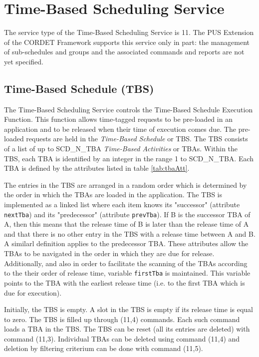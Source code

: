 \documentclass{pnp_article}
\begin{document}
\section{Time-Based Scheduling Service}\label{sec:serv11}
The service type of the Time-Based Scheduling Service is 11. The PUS Extension of the CORDET Framework supports this service only in part: the management of sub-schedules and groups and the associated commands and reports are not yet specified. 

\subsection{Time-Based Schedule (TBS)}
The Time-Based Scheduling Service controls the Time-Based Schedule Execution Function. This function allows time-tagged requests to be pre-loaded in an application and to be released when their time of execution comes due. The pre-loaded requests are held in the \textit{Time-Based Schedule} or TBS. The TBS consists of a list of up to SCD\_N\_TBA \textit{Time-Based Activities} or TBAs. Within the TBS, each TBA is identified by an integer in the range 1 to SCD\_N\_TBA. Each TBA is defined by the attributes listed in table \ref{tab:tbaAtt}. 

The entries in the TBS are arranged in a random order which is determined by the order in which the TBAs are loaded in the application. The TBS is implemented as a linked list where each item knows its "successor" (attribute \texttt{nextTba}) and its "predecessor" (attribute \texttt{prevTba}). If B is the successor TBA of A, then this means that the release time of B is later than the release time of A and that there is no other entry in the TBS with a release time between A and B. A similarl definition applies to the predecessor TBA. These attributes allow the TBAs to be navigated in the order in which they are due for release. Additionally, and also in order to facilitate the scanning of the TBAs according to the their order of release time, variable \texttt{firstTba} is maintained. This variable points to the TBA with the earliest release time (i.e. to the first TBA which is due for execution). 

Initially, the TBS is empty. A slot in the TBS is empty if its release time is equal to zero. The TBS is filled up through (11,4) commands. Each such command loads a TBA in the TBS. The TBS can be reset (all its entries are deleted) with command (11,3). Individual TBAs can be deleted using command (11,4) and deletion by filtering criterium can be done with command (11,5).
\end{document}
